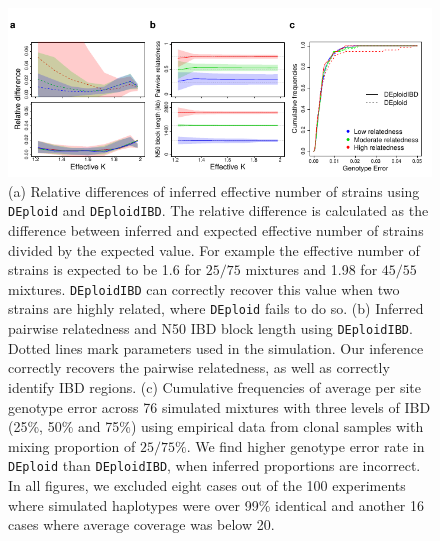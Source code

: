 \documentclass[9pt,lineno]{elife}
\begin{document}
\begin{figure}[htp]
  \begin{center}
  \includegraphics[width=\textwidth]{Fig2.pdf}
  \caption{(a) Relative differences of inferred effective number of strains using \texttt{DEploid} and \texttt{DEploidIBD}. The relative difference is calculated as the difference between inferred and expected effective number of strains divided by the expected value. For example the effective number of strains is expected to be 1.6 for $25/75$ mixtures and 1.98 for $45/55$ mixtures. \texttt{DEploidIBD} can correctly recover this value when two strains are highly related, where \texttt{DEploid} fails to do so. (b) Inferred pairwise relatedness and N50 IBD block length using \texttt{DEploidIBD}. Dotted lines mark parameters used in the simulation. Our inference correctly recovers the pairwise relatedness, as well as correctly identify IBD regions. (c) Cumulative frequencies of average per site genotype error across 76 simulated mixtures with three levels of IBD (25\%, 50\% and 75\%) using empirical data from clonal samples with mixing proportion of $25/75\%$. We find higher genotype error rate in \texttt{DEploid} than \texttt{DEploidIBD}, when inferred proportions are incorrect. In all figures, we excluded eight cases out of the 100 experiments where simulated haplotypes were over 99\% identical and another 16 cases where average coverage was below 20.
}\label{fig:benchmark}
  \end{center}

\end{figure}
\end{document}
